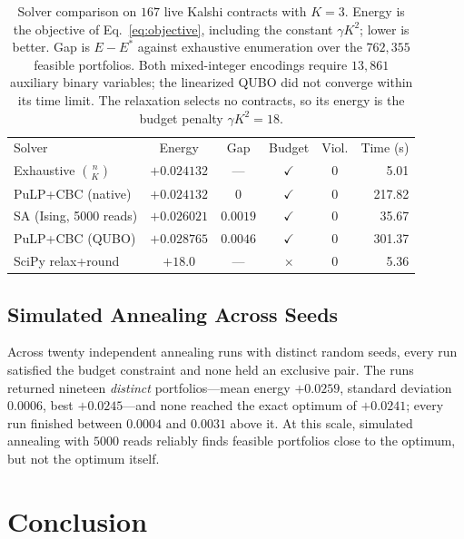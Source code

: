 \documentclass[aps, reprint, prl, twocolumn, superscriptaddress,amsmath,amssymb,noeprint]{revtex4-2}
\begin{document}
\begin{table}[b]
\caption{\label{tab:benchmark}Solver comparison on $167$ live Kalshi contracts
with $K=3$.  Energy is the objective of Eq.~\eqref{eq:objective}, including
the constant $\gamma K^2$; lower is better.  Gap is $E - E^\ast$ against
exhaustive enumeration over the $762{,}355$ feasible portfolios.  Both
mixed-integer encodings require $13{,}861$ auxiliary binary variables; the
linearized QUBO did not converge within its time limit.  The relaxation selects
no contracts, so its energy is the budget penalty $\gamma K^2 = 18$.}
\begin{ruledtabular}
\begin{tabular}{lccccr}
Solver & Energy & Gap & Budget & Viol. & Time (s) \\
\colrule
Exhaustive $\binom{n}{K}$ & $+0.024132$ & ---        & $\checkmark$ & 0 & 5.01 \\
PuLP+CBC (native)         & $+0.024132$ & $0$        & $\checkmark$ & 0 & 217.82 \\
SA (Ising, 5000 reads)    & $+0.026021$ & $0.0019$   & $\checkmark$ & 0 & 35.67 \\
PuLP+CBC (QUBO)           & $+0.028765$ & $0.0046$   & $\checkmark$ & 0 & 301.37 \\
SciPy relax+round         & $+18.0$     & ---        & $\times$     & 0 & 5.36 \\
\end{tabular}
\end{ruledtabular}
\end{table}

\subsection{Simulated Annealing Across Seeds}
\label{sec:robustness}

Across twenty independent annealing runs with distinct random seeds, every run
satisfied the budget constraint and none held an exclusive pair.  The runs
returned nineteen \emph{distinct} portfolios---mean energy $+0.0259$, standard
deviation $0.0006$, best $+0.0245$---and none reached the exact optimum of
$+0.0241$; every run finished between $0.0004$ and $0.0031$ above it.  At this
scale, simulated annealing with $5000$ reads reliably finds feasible portfolios
close to the optimum, but not the optimum itself.

\section{Conclusion}
\end{document}

